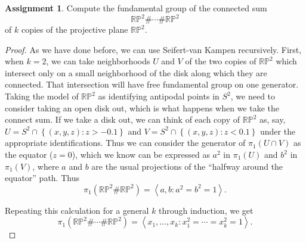 \documentclass[12pt]{article}
\theoremstyle{definition}
\newtheorem{ex}{Assignment}
\begin{document}
\begin{ex}
	Compute the fundamental group of the connected sum \begin{equation*}
		\mathbb{RP}^2 \# \cdots \# \mathbb{RP}^2
	\end{equation*}
	of $k$ copies of the projective plane $\mathbb{RP}^2$.
\end{ex}
\begin{proof}
	As we have done before, we can use Seifert-van Kampen recursively.
	First, when $k = 2$, we can take neighborhoods $U$ and $V$ of the two copies of $\mathbb{RP}^2$ which intersect only on a small neighborhood of the disk along which they are connected.
	That intersection will have free fundamental group on one generator.
	Taking the model of $\mathbb{RP}^2$ as identifying antipodal points in $S^2$, we need to consider taking an open disk out, which is what happens when we take the connect sum.
	If we take a disk out, we can think of each copy of $\mathbb{RP}^2$ as, say, $U = S^2 \cap \left\lbrace (x, y, z) : z > -0.1 \right\rbrace$ and $V = S^2 \cap \left\lbrace (x, y, z) : z < 0.1 \right\rbrace$ under the appropriate identifications.
	Thus we can consider the generator of $\pi_1(U \cap V)$ as the equator ($z = 0$), which we know can be expressed as $a^2$ in $\pi_1(U)$ and $b^2$ in $\pi_1(V)$, where $a$ and $b$ are the usual projections of the ``halfway around the equator'' path.
	Thus \begin{equation*}
		\pi_1(\mathbb{RP}^2 \# \mathbb{RP}^2) = \left\langle a, b : a^2 = b^2 = 1 \right\rangle.
	\end{equation*}

	Repeating this calculation for a general $k$ through induction, we get \begin{equation*}
		\pi_1(\mathbb{RP}^2 \# \cdots \# \mathbb{RP}^2) = \left\langle x_1, \dots, x_k : x_1^2 = \cdots = x_k^2 = 1 \right\rangle.
	\end{equation*}
\end{proof}
\end{document}
